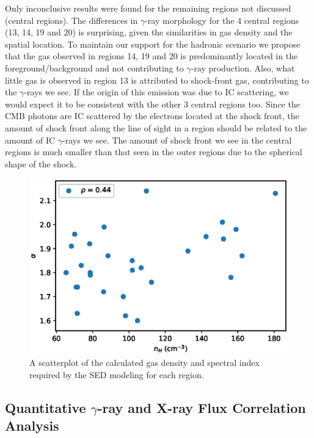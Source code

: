 \documentclass[12pt,a4paper]{article}
\begin{document}
Only inconclusive results were found for the remaining regions not discussed (central regions).
The differences in $\gamma$-ray morphology for the 4 central regions (13, 14, 19 and 20) is surprising, given the similarities in gas density and the spatial location.
To maintain our support for the hadronic scenario we propose that the gas observed in regions 14, 19 and 20 is predominantly located in the foreground/background and not contributing to $\gamma$-ray production.
Also, what little gas is observed in region 13 is attributed to shock-front gas, contributing to the $\gamma$-rays we see.
If the origin of this emission was due to IC scattering, we would expect it to be consistent with the other 3 central regions too.
Since the CMB photons are IC scattered by the electrons located at the shock front, the amount of shock front along the line of sight in a region should be related to the amount of IC $\gamma$-rays we see.
The amount of shock front we see in the central regions is much smaller than that seen in the outer regions due to the spherical shape of the shock.


\begin{figure}[H]
	\centering
	\includegraphics[width=0.60\linewidth, height=0.27\textheight]{nH_alpha_correlation}
	\caption{A scatterplot of the calculated gas density and spectral index required by the SED modeling for each region.}
	\label{fig:nH alpha correlation}
\end{figure}



\subsection{Quantitative $\gamma$-ray and X-ray Flux Correlation Analysis}
\end{document}
